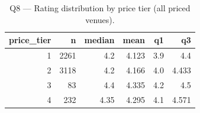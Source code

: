 \begin{table}[ht]
\centering
\caption{Q8 — Rating distribution by price tier (all priced venues).}
\label{tab:q8_price_tier_rating}
{\tiny
\begin{tabular}{rrrrrr}
\toprule
price\_tier & n & median & mean & q1 & q3 \\
\midrule
1 & 2261 & 4.2 & 4.123 & 3.9 & 4.4 \\
2 & 3118 & 4.2 & 4.166 & 4.0 & 4.433 \\
3 & 83 & 4.4 & 4.335 & 4.2 & 4.5 \\
4 & 232 & 4.35 & 4.295 & 4.1 & 4.571 \\
\bottomrule
\end{tabular}
}
\end{table}
